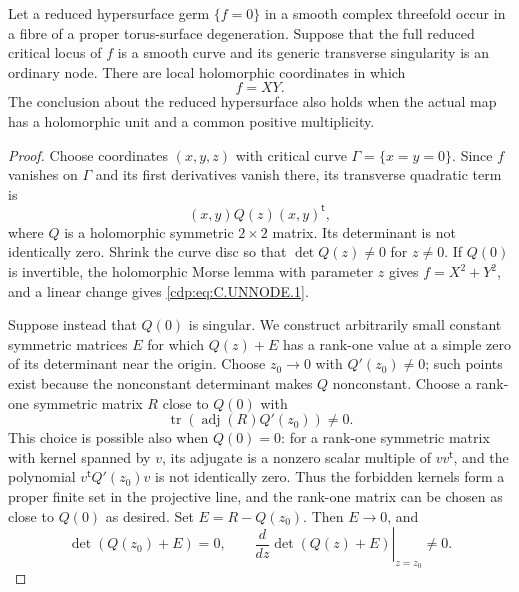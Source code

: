 
\begin{proposition}\label{cdp:st:C.2.UN.9}
Let a reduced hypersurface germ $\{f=0\}$ in a smooth
complex threefold occur in a fibre of a proper torus-surface
degeneration. Suppose that the full reduced critical locus
of $f$ is a smooth curve and its generic transverse
singularity is an ordinary node. There are local
holomorphic coordinates in which
\[
                            f=XY.                  \tag{C.UNNODE.1}\label{cdp:eq:C.UNNODE.1}
\]
The conclusion about the reduced hypersurface also holds
when the actual map has a holomorphic unit and a common
positive multiplicity.
\end{proposition}
\begin{proof}
Choose coordinates $(x,y,z)$ with critical curve
$\Gamma=\{x=y=0\}$. Since $f$ vanishes on $\Gamma$ and
its first derivatives vanish there, its transverse
quadratic term is
\[
                  (x,y)Q(z)(x,y)^{\mathsf t},
\]
where $Q$ is a holomorphic symmetric $2\times2$ matrix.
Its determinant is not identically zero. Shrink the
curve disc so that $\det Q(z)\ne0$ for $z\ne0$.
If $Q(0)$ is invertible, the holomorphic Morse lemma
with parameter $z$ gives $f=X^2+Y^2$, and a linear
change gives \eqref{cdp:eq:C.UNNODE.1}.

Suppose instead that $Q(0)$ is singular. We construct
arbitrarily small constant symmetric matrices $E$
for which $Q(z)+E$ has a rank-one value at a simple
zero of its determinant near the origin. Choose
$z_0\to0$ with $Q'(z_0)\ne0$; such points exist
because the nonconstant determinant makes $Q$
nonconstant. Choose a rank-one symmetric matrix
$R$ close to $Q(0)$ with
\[
                  \operatorname{tr}
                      (\operatorname{adj}(R)Q'(z_0))\ne0.
\]
This choice is possible also when $Q(0)=0$: for a
rank-one symmetric matrix with kernel spanned by
$v$, its adjugate is a nonzero scalar multiple of
$vv^{\mathsf t}$, and the polynomial
$v^{\mathsf t}Q'(z_0)v$ is not identically zero.
Thus the forbidden kernels form a proper finite
set in the projective line, and the rank-one
matrix can be chosen as close to $Q(0)$ as desired.
Set $E=R-Q(z_0)$. Then $E\to0$, and
\[
 \det(Q(z_0)+E)=0,\qquad
 \left.\frac{d}{dz}\det(Q(z)+E)\right|_{z=z_0}\ne0.
 \tag{C.UNNODE.2}\label{cdp:eq:C.UNNODE.2}
\]


\end{proof}
